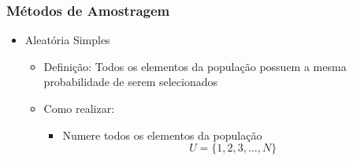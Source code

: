 \documentclass[12pt]{article}
\begin{document}
\subsubsection{Métodos de Amostragem}
\begin{itemize}
    \item Aleatória Simples
    \begin{itemize}
        \item Definição: Todos os elementos da população possuem a mesma 
        probabilidade de serem selecionados
        \item Como realizar:
        \begin{itemize}
            \item Numere todos os elementos da população
            \[U=\{1,2,3,\dots,N\}\]
            \begin{scriptsize}


\end{scriptsize}
\end{itemize}
\end{itemize}
\end{itemize}
\end{document}
